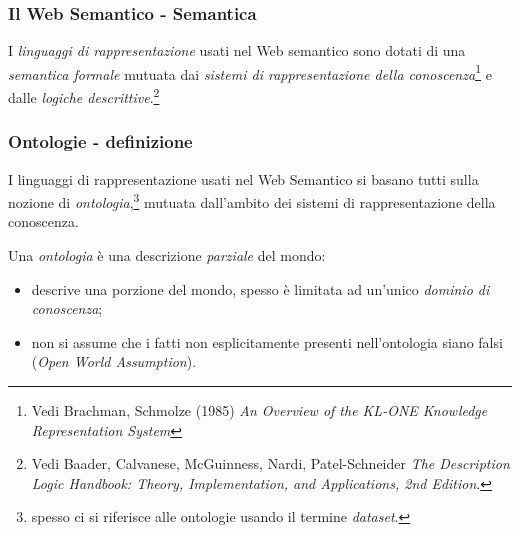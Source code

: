 \documentclass[8pt]{beamer}
\begin{document}
\begin{frame}
\frametitle{Il Web Semantico - Semantica}

I \emph{linguaggi di rappresentazione} usati nel Web semantico 
sono dotati di una \emph{semantica formale} mutuata dai 
\emph{sistemi di rappresentazione della conoscenza}\footnote{Vedi
Brachman, Schmolze (1985) \emph{An Overview of the KL-ONE Knowledge
Representation System}} e dalle \emph{logiche descrittive}.\footnote{Vedi 
Baader, Calvanese, McGuinness, Nardi, Patel-Schneider \emph{The Description 
Logic Handbook: Theory, Implementation, and Applications, 2nd Edition}.}
\vspace{\baselineskip}

\end{frame}

\begin{frame}
\frametitle{Ontologie - definizione}
 I linguaggi di rappresentazione usati nel Web Semantico
 si basano tutti sulla nozione di \emph{ontologia},\footnote{spesso ci si riferisce alle ontologie usando il
termine \emph{dataset}.} mutuata
 dall'ambito dei sistemi di rappresentazione della conoscenza.
\vspace{\baselineskip}

Una \emph{ontologia} \`e una descrizione \emph{parziale} del mondo:
\begin{itemize}
 \item descrive una porzione del mondo, spesso \`e limitata ad un'unico \emph{dominio di conoscenza};
 \item non si assume che i fatti non esplicitamente presenti nell'ontologia siano falsi (\emph{Open World Assumption}).
\end{itemize}
\vspace{\baselineskip}

\end{frame}
\end{document}
